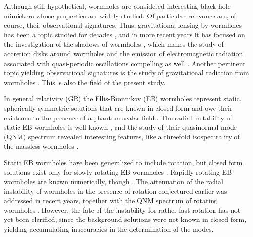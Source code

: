 \documentclass[11pt,a4paper]{article}
\begin{document}
Although still hypothetical, wormholes are considered interesting black hole mimickers\cite{Damour:2007ap} whose properties are widely studied.
Of particular relevance are, of course, their observational signatures.
Thus, gravitational lensing by wormholes has been a topic studied for decades
\cite{Cramer:1994qj,Safonova:2001vz,Perlick:2003vg,Nandi:2006ds,Abe:2010ap,Toki:2011zu,Nakajima:2012pu,Tsukamoto:2012xs,Kuhfittig:2013hva,Bambi:2013nla,Takahashi:2013jqa,Tsukamoto:2016zdu}, and in more recent years it has focused on the investigation of the shadows of wormholes \cite{Bambi:2013nla,Nedkova:2013msa,Ohgami:2015nra,Shaikh:2018kfv,Gyulchev:2018fmd,Bouhmadi-Lopez:2021zwt,Guerrero:2022qkh,Huang:2023yqd,Takahashi:2026hfp}, 
which makes the study of accretion disks around wormholes and the emission of electromagnetic radiation associated with quasi-periodic oscillations compelling as well
\cite{Harko:2008vy,Harko:2009xf,Bambi:2013jda,Zhou:2016koy,Lamy:2018zvj,Deligianni:2021ecz,Deligianni:2021hwt,Gjorgjieski:2025rjy}.
Another pertinent topic yielding observational signatures is the study of gravitational radiation from wormholes \cite{Konoplya:2005et,Kim:2008zzj,Konoplya:2010kv,Konoplya:2016hmd,Bueno:2017hyj,Volkel:2018hwb,Aneesh:2018hlp,Konoplya:2018ala,Blazquez-Salcedo:2018ipc,Konoplya:2019hml,Churilova:2019qph,Jusufi:2020mmy,Bronnikov:2021liv,Gonzalez:2022ote,Azad:2022qqn}.
This is also the field of the present study.

In general relativity (GR) the Ellis-Bronnikov (EB) wormholes represent static, spherically symmetric solutions that are known in closed form and owe their existence to the presence of a phantom scalar field \cite{Ellis:1973yv,Bronnikov:1973fh}.
The radial instability of static EB wormholes is well-known \cite{Shinkai:2002gv,Gonzalez:2008wd,Gonzalez:2008xk,Cremona:2018wkj,Xu:2025jad}, and the study of their quasinormal mode (QNM) spectrum revealed interesting features, like a threefold isospectrality of the massless wormholes \cite{Azad:2022qqn}.

Static EB wormholes have been generalized to include rotation, but closed form solutions exist only for slowly rotating EB wormholes \cite{Kashargin:2007mm,Kashargin:2008pk}.
Rapidly rotating EB wormholes are known numerically, though \cite{Kleihaus:2014dla,Chew:2016epf,Volkov:2021blw}.
The attenuation of the radial instability of wormholes in the presence of rotation conjectured earlier \cite{Matos:2010pcd} was addressed in recent years, together with the QNM spectrum of rotating wormholes \cite{Azad:2023iju,Azad:2024axu,Khoo:2024yeh,Azad:2025kay}.
However, the fate of the instability for rather fast rotation has not yet been clarified, since the background solutions were not known in closed form, yielding accumulating inaccuracies in the determination of the modes.
\end{document}
